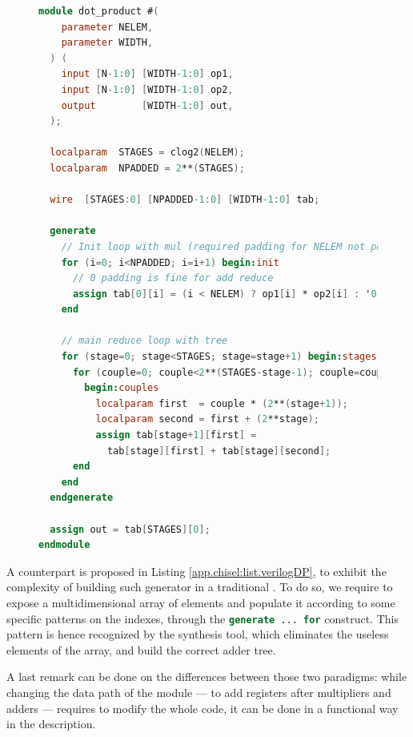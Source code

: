             \begin{figure}[h!]
                \begin{lstlisting}[language=Verilog,basewidth={0.5em, 0.4em},tabsize=2,numbers=none,xleftmargin=-2mm,
                                   caption={Dot product generic implementation in Verilog},
                                   label={app.chisel:list.verilogDP}]
module dot_product #(
    parameter NELEM,
    parameter WIDTH,
  ) (
    input [N-1:0] [WIDTH-1:0] op1,
    input [N-1:0] [WIDTH-1:0] op2,
    output        [WIDTH-1:0] out,
  );

  localparam  STAGES = clog2(NELEM);
  localparam  NPADDED = 2**(STAGES);

  wire  [STAGES:0] [NPADDED-1:0] [WIDTH-1:0] tab;

  generate
    // Init loop with mul (required padding for NELEM not power of 2)
    for (i=0; i<NPADDED; i=i+1) begin:init
      // 0 padding is fine for add reduce
      assign tab[0][i] = (i < NELEM) ? op1[i] * op2[i] : '0;
    end

    // main reduce loop with tree
    for (stage=0; stage<STAGES; stage=stage+1) begin:stages
      for (couple=0; couple<2**(STAGES-stage-1); couple=couple+1)
        begin:couples
          localparam first  = couple * (2**(stage+1));
          localparam second = first + (2**stage);
          assign tab[stage+1][first] =
            tab[stage][first] + tab[stage][second];
      end
    end
  endgenerate

  assign out = tab[STAGES][0];
endmodule\end{lstlisting}
            \end{figure}

            A \verilog{} counterpart is proposed in Listing \ref{app.chisel:list.verilogDP}, to exhibit the complexity of building such generator in a traditional .
            To do so, we require to expose a multidimensional array of elements and populate it according to some specific patterns on the indexes, through the \lstinline[language=Verilog]{generate ... for} construct.
            This pattern is hence recognized by the synthesis tool, which eliminates the useless elements of the array, and build the correct adder tree.

\clearpage
            A last remark can be done on the differences between those two paradigms: while changing the data path of the \verilog{} module --- \eg to add registers after multipliers and adders --- requires to modify the whole code, it can be done in a functional way in the \chisel{} description.

